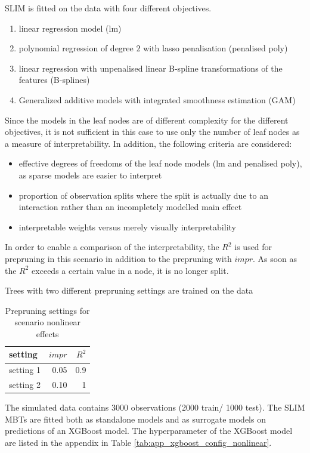 SLIM is fitted on the data with four different objectives.
\begin{enumerate}
    \item linear regression model (lm)
    \item polynomial regression of degree $2$ with lasso penalisation (penalised poly)
    \item linear regression with unpenalised linear B-spline transformations of the features (B-splines)
    \item Generalized additive models with integrated smoothness estimation \citep{Wood.2011} (GAM)
\end{enumerate}


Since the models in the leaf nodes are of different complexity for the different objectives, it is not sufficient in this case to use only the number of leaf nodes as a measure of interpretability. In addition, the following criteria are considered:
\begin{itemize}
    \item effective degrees of freedoms of the leaf node models (lm and penalised poly), as sparse models are easier to interpret
    \item proportion of observation splits where the split is actually due to an interaction rather than an incompletely modelled main effect
    \item interpretable weights versus merely visually interpretability
\end{itemize}

In order to enable a comparison of the interpretability, the $R^2$ is used for prepruning in this scenario in addition to the prepruning with $impr$. As soon as the $R^2$ exceeds a certain value in a node, it is no longer split. 

Trees with two different prepruning settings are trained on the data
\begin{table}[!htt]
    \centering
    \begin{tabular}{l|r|r}
        \hline
        setting  &  $impr$ & $R^2$ \\
        \hline
        setting 1 & 0.05 & 0.9 \\
        setting 2 & 0.10 & 1  \\
        \hline

    \end{tabular}
    \caption{Prepruning settings for scenario nonlinear effects}
\end{table}

The simulated data contains 3000 observations (2000 train/ 1000 test). The SLIM MBTs are fitted both as standalone models and as surrogate models on predictions of an XGBoost model. The hyperparameter of the XGBoost model are listed in the appendix in Table \ref{tab:app_xgboost_config_nonlinear}.


